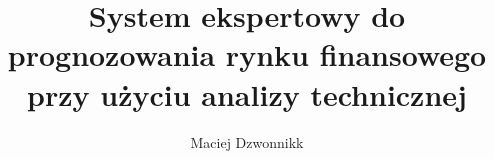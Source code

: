 \documentclass[a4paper,12pt,twoside]{book}
\author{Maciej Dzwonnikk}
\title{System ekspertowy do prognozowania rynku finansowego przy użyciu analizy technicznej}
\begin{document}
\frontmatter

\tableofcontents

\mainmatter
\pagestyle{headings}


%




\nocite{*}




\appendix
\renewcommand{\chaptermark}[1]{%
\markboth{\MakeUppercase{%
DODATEK \thechapter.%
\ }}{}}
%

\end{document}
